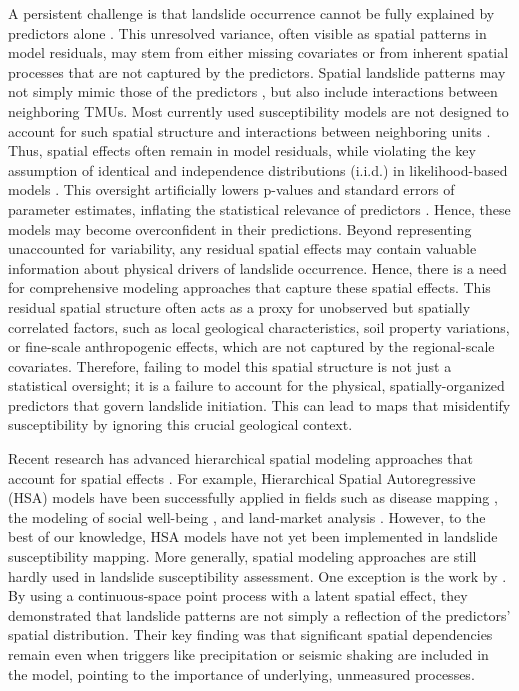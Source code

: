 \documentclass[journal abbreviation, manuscript]{copernicus}
\begin{document}
A persistent challenge is that landslide occurrence cannot be fully explained by predictors alone \citep{di2023estimation}. This unresolved variance, often visible as spatial patterns in model residuals, may stem from either missing covariates or from inherent spatial processes that are not captured by the predictors. Spatial landslide patterns may not simply mimic those of the predictors \citep{lombardo2020space}, but also include interactions between neighboring TMUs. Most currently used susceptibility models are not designed to account for such spatial structure and interactions between neighboring units \citep{fang2023space}. Thus, spatial effects often remain in model residuals, while violating the key assumption of identical and independence distributions (i.i.d.) in likelihood-based models \citep{wagner2013rethinking}. This oversight artificially lowers p-values and standard errors of parameter estimates, inflating the statistical relevance of predictors \citep{lee2021network, lombardo2020space}. Hence, these models may become overconfident in their predictions. Beyond representing unaccounted for variability, any residual spatial effects may contain valuable information about physical drivers of landslide occurrence. Hence, there is a need for comprehensive modeling approaches that capture these spatial effects. This residual spatial structure often acts as a proxy for unobserved but spatially correlated factors, such as local geological characteristics, soil property variations, or fine-scale anthropogenic effects, which are not captured by the regional-scale covariates. Therefore, failing to model this spatial structure is not just a statistical oversight; it is a failure to account for the physical, spatially-organized predictors that govern landslide initiation. This can lead to maps that misidentify susceptibility by ignoring this crucial geological context.

Recent research has advanced hierarchical spatial modeling approaches that account for spatial effects \citep{dong2015multilevel, morris2019bayesian, lawson2018bayesian}. For example, Hierarchical Spatial Autoregressive (HSA) models have been successfully applied in fields such as disease mapping \citep{vranckx2019comparison}, the modeling of social well-being \citep{pierewan2014spatial}, and land-market analysis \citep{dong2015multilevel}. However, to the best of our knowledge, HSA models have not yet been implemented in landslide susceptibility mapping. More generally, spatial modeling approaches are still hardly used in landslide susceptibility assessment. One exception is the work by \citet{lombardo2018point, lombardo2019geostatistical, lombardo2020space}. By using a continuous-space point process with a latent spatial effect, they demonstrated that landslide patterns are not simply a reflection of the predictors' spatial distribution. Their key finding was that significant spatial dependencies remain even when triggers like precipitation or seismic shaking are included in the model, pointing to the importance of underlying, unmeasured processes.
\end{document}
